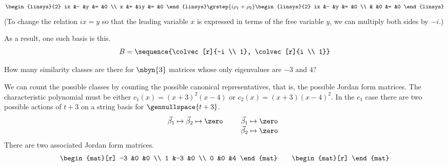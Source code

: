 \begin{exercises}
\begin{answer}
\begin{equation*}
         \begin{linsys}{2}
           ix  &-  &y  &=  &0  \\
            x  &+  &iy &=  &0
         \end{linsys}
         \grstep{i\rho_1+\rho_2}
         \begin{linsys}{2}
           ix  &-  &y  &=  &0  \\
               &   &0  &=  &0
         \end{linsys}
       \end{equation*}
       (To change the relation $ix=y$ so that the leading variable $x$ is
       expressed in terms of the free variable $y$, we can multiply both
       sides by $-i$.)

       As a result, one such basis is this.
       \begin{equation*}
         B=\sequence{\colvec[r]{-i \\ 1},
                     \colvec[r]{i \\ 1}}
       \end{equation*}  
     \end{answer}
  \item 
    How many similarity classes are there for \( \nbyn{3} \) matrices
    whose only eigenvalues are \( -3 \) and \( 4 \)?
    \begin{answer}
     We can count the possible classes by counting the possible
     canonical representatives, that is, the possible Jordan form matrices.
     The characteristic polynomial must be either $c_1(x)=(x+3)^2(x-4)$
     or $c_2(x)=(x+3)(x-4)^2$.
     In the $c_1$ case there are two possible actions 
     of $t+3$ on a string basis for $\gennullspace{t+3}$.
     \begin{equation*}
       \vec{\beta}_1\mapsto\vec{\beta}_2\mapsto \zero
       \qquad
       \begin{array}[t]{l}
         \vec{\beta}_1\mapsto\zero \\
         \vec{\beta}_2\mapsto\zero 
       \end{array}
     \end{equation*}
     There are two associated Jordan form matrices.
     \begin{equation*}
        \begin{mat}[r]
          -3  &0  &0  \\
           1  &-3 &0  \\
           0  &0  &4
        \end{mat}
        \qquad
        \begin{mat}[r]

\end{mat}
\end{equation*}
\end{answer}
\end{exercises}
